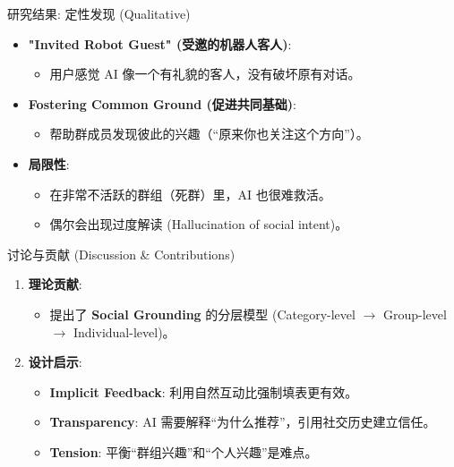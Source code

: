 \documentclass[aspectratio=169]{beamer}
\begin{document}
\begin{frame}{研究结果: 定性发现 (Qualitative)}
    \begin{itemize}
        \item \textbf{"Invited Robot Guest" (受邀的机器人客人)}:
        \begin{itemize}
            \item 用户感觉 AI 像一个有礼貌的客人，没有破坏原有对话。
        \end{itemize}
        \vspace{0.5cm}
        \item \textbf{Fostering Common Ground (促进共同基础)}:
        \begin{itemize}
            \item 帮助群成员发现彼此的兴趣（“原来你也关注这个方向”）。
        \end{itemize}
        \vspace{0.5cm}
        \item \textbf{局限性}:
        \begin{itemize}
            \item 在非常不活跃的群组（死群）里，AI 也很难救活。
            \item 偶尔会出现过度解读 (Hallucination of social intent)。
        \end{itemize}
    \end{itemize}
\end{frame}

\begin{frame}{讨论与贡献 (Discussion \& Contributions)}
    \begin{enumerate}
        \item \textbf{理论贡献}: 
        \begin{itemize}
            \item 提出了 \textbf{Social Grounding} 的分层模型 (Category-level $\rightarrow$ Group-level $\rightarrow$ Individual-level)。
        \end{itemize}
        \vspace{0.5cm}
        \item \textbf{设计启示}:
        \begin{itemize}
            \item \textbf{Implicit Feedback}: 利用自然互动比强制填表更有效。
            \item \textbf{Transparency}: AI 需要解释“为什么推荐”，引用社交历史建立信任。
            \item \textbf{Tension}: 平衡“群组兴趣”和“个人兴趣”是难点。
        \end{itemize}
    \end{enumerate}
\end{frame}
\end{document}
